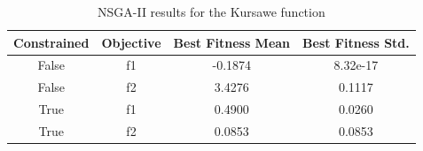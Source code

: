\begin{table}[H]
    \centering
    \begin{tabular}{|c|c|c|c|}
        \hline
        Constrained & Objective & Best Fitness Mean & Best Fitness Std. \\ \hline
        False       & f1        & -0.1874           & 8.32e-17          \\
        False       & f2        & 3.4276            & 0.1117            \\ \hline
        True        & f1        & 0.4900            & 0.0260            \\
        True        & f2        & 0.0853            & 0.0853            \\
    \end{tabular}
    \caption{NSGA-II results for the Kursawe function}
    \label{tab:disk_nsga}
\end{table}